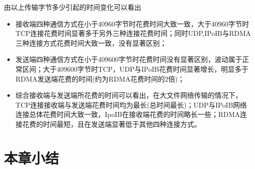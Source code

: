 {    由以上传输字节多少引起的时间变化可以看出
    \begin{itemize}
        \item 接收端四种通信方式在小于40960字节时花费时间大致一致，大于40960字节时TCP连接花费时间显著多于另外三种连接花费时间；同时UDP,IPoIB与RDMA三种连接方式花费时间大致一致，没有显著区别；
        \item 发送端四种通信方式在小于409600字节时花费时间没有显著区别，波动属于正常区间；大于409600字节时TCP，UDP与IPoIB花费时间显著增长，明显多于RDMA发送端花费的时间(约为RDMA花费时间的2倍)；
        \item 综合接收端与发送端所花费的时间可以看出，在大文件网络传输的情况下，TCP连接接收端与发送端花费时间均为最长(总时间最长)；UDP与IPoIB网络连接总体花费时间大致一致，IpoIB在接收端花费的时间略长一些；RDMA连接花费的时间最短，且在发送端显著低于其他四种连接方式。
    \end{itemize}

    \section{本章小结}
}